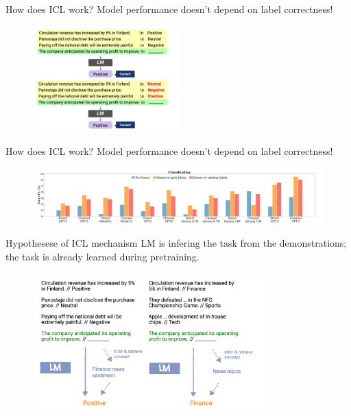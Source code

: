 \documentclass[usenames,dvipsnames,notes,11pt,aspectratio=169,hyperref={colorlinks=true, linkcolor=blue}]{beamer}
\begin{document}
\begin{frame}
    {How does ICL work?}{}
    Model performance doesn't depend on label correctness!
    \begin{figure}
        \includegraphics[width=0.5\textwidth]{figures/icl-random-ex}
    \end{figure}
\end{frame}

\begin{frame}
    {How does ICL work?}{}
    Model performance doesn't depend on label correctness!
    \begin{figure}
        \includegraphics[width=\textwidth]{figures/icl-random}
    \end{figure}
\end{frame}

\begin{frame}
    {Hypothesese of ICL mechanism}{}
    LM is infering the task from the demonstrations; the task is already learned during pretraining.
    \begin{figure}
        \includegraphics[width=0.8\textwidth]{figures/icl-infer}
    \end{figure}
\end{frame}
\end{document}
